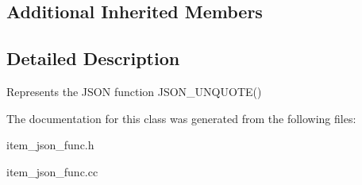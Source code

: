 \subsection*{Additional Inherited Members}


\subsection{Detailed Description}
Represents the J\+S\+ON function J\+S\+O\+N\+\_\+\+U\+N\+Q\+U\+O\+T\+E() 

The documentation for this class was generated from the following files\+:\begin{DoxyCompactItemize}
\item 
item\+\_\+json\+\_\+func.\+h\item 
item\+\_\+json\+\_\+func.\+cc\end{DoxyCompactItemize}

